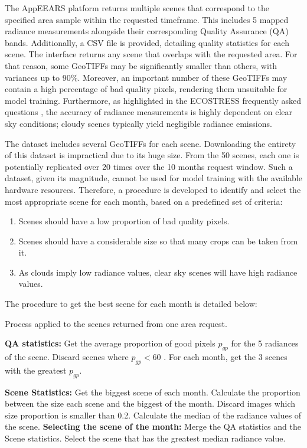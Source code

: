     The AppEEARS platform returns multiple scenes that correspond to the specified area sample within the requested timeframe. This includes 5 mapped radiance measurements alongside their corresponding Quality Assurance (QA) bands. Additionally, a CSV file is provided, detailing quality statistics  for each scene. The interface returns any scene that overlaps with the requested area. For that reason, some GeoTIFFs may be significantly smaller than others, with variances up to 90\%. Moreover, an important number of these GeoTIFFs may contain a high percentage of bad quality pixels, rendering them unsuitable for model training. Furthermore, as highlighted in the ECOSTRESS frequently asked questions \cite{ecostress_faq}, the accuracy of radiance measurements is highly dependent on clear sky conditions; cloudy scenes typically yield negligible radiance emissions.

    The dataset includes several GeoTIFFs for each scene. Downloading the entirety of this dataset is impractical due to its huge size.  From the 50 scenes, each one is potentially replicated over 20 times over the 10 months request window. Such a dataset, given its magnitude, cannot be used for model training with the available hardware resources. Therefore, a procedure is developed to identify and select the most appropriate scene for each month, based on a predefined set of criteria:

    \begin{enumerate}
        \item Scenes should have a low proportion of bad quality pixels.
        \item Scenes should have a considerable size so that many crops can be taken from it.
        \item As clouds imply low radiance values, clear sky scenes will have high radiance values.
    \end{enumerate}


    The procedure to get the best scene for each month is detailed below: 

    \begin{algorithm}
    \caption{Process applied to the scenes returned from one area request.}
    \begin{algorithmic}[1]
    
    \State \textbf{QA statistics:}
    \State Get the average proportion of good pixels $p_{gp}$ for the 5 radiances of the scene.
    \State Discard scenes where $p_{gp} < 60 $ .
    \State For each month, get the 3 scenes with the greatest $p_{gp}$.
    
    \State \textbf{Scene Statistics:}
    \State Get the biggest scene of each month.
    \State Calculate the proportion between the size each scene and the biggest of the month.
    \State Discard images which size proportion is smaller than 0.2.
    \State Calculate the median of the radiance values of the scene.
    \State \textbf{Selecting the scene of the month:}
    \State Merge the QA statistics and the Scene statistics.
    \State Select the scene that has the greatest median radiance value.
    \end{algorithmic}
    \end{algorithm}


